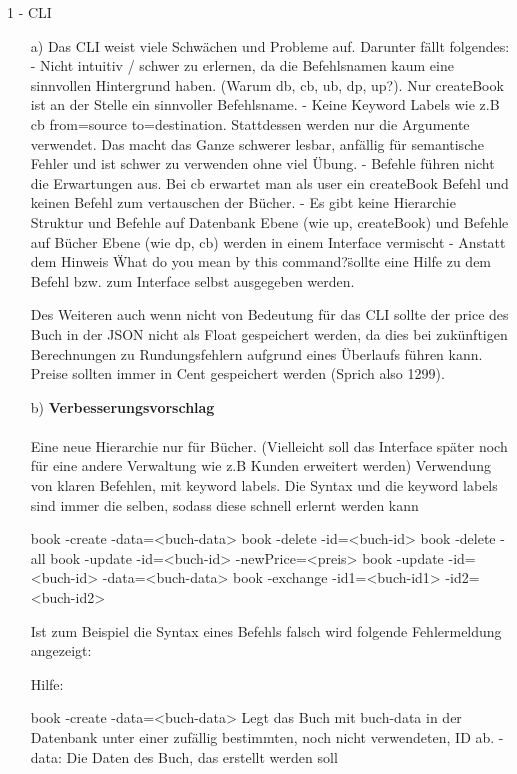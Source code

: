 \documentclass[a4paper]{article}
\begin{document}
\begin{exercise}{1 - CLI} 
\begin{itemize}
\item[a)]
Das CLI weist viele Schwächen und Probleme auf. Darunter fällt folgendes:
  - Nicht intuitiv / schwer zu erlernen, da die Befehlsnamen kaum eine sinnvollen
    Hintergrund haben. (Warum db, cb, ub, dp, up?). Nur createBook ist an der
    Stelle ein sinnvoller Befehlsname.
  - Keine Keyword Labels wie z.B cb from=source to=destination. Stattdessen werden
    nur die Argumente verwendet. Das macht das Ganze schwerer lesbar, anfällig
    für semantische Fehler und ist schwer zu verwenden ohne viel Übung.
  - Befehle führen nicht die Erwartungen aus. Bei cb erwartet man als user ein
    createBook Befehl und keinen Befehl zum vertauschen der Bücher.
  - Es gibt keine Hierarchie Struktur und Befehle auf Datenbank Ebene (wie up,
    createBook) und Befehle auf Bücher Ebene (wie dp, cb) werden in einem
    Interface vermischt
  - Anstatt dem Hinweis \"What do you mean by this command?\" sollte eine Hilfe
    zu dem Befehl bzw. zum Interface selbst ausgegeben werden.

Des Weiteren auch wenn nicht von Bedeutung für das CLI sollte der price des Buch
in der JSON nicht als Float gespeichert werden, da dies bei zukünftigen
Berechnungen zu Rundungsfehlern aufgrund eines Überlaufs führen kann. Preise
sollten immer in Cent gespeichert werden (Sprich also 1299).

\item[b)]\textbf{Verbesserungsvorschlag}\\\\
Eine neue Hierarchie nur für Bücher. (Vielleicht soll das Interface später noch
für eine andere Verwaltung wie z.B Kunden erweitert werden)
Verwendung von klaren Befehlen, mit keyword labels. Die Syntax und die keyword
labels sind immer die selben, sodass diese schnell erlernt werden kann

book -create -data=<buch-data>
book -delete -id=<buch-id>
book -delete -all
book -update -id=<buch-id> -newPrice=<preis>
book -update -id=<buch-id> -data=<buch-data>
book -exchange -id1=<buch-id1> -id2=<buch-id2>

Ist zum Beispiel die Syntax eines Befehls falsch wird folgende Fehlermeldung angezeigt:

Hilfe:

book -create -data=<buch-data>
  Legt das Buch mit buch-data in der Datenbank unter einer zufällig bestimmten, noch nicht verwendeten, ID ab.
  -data: Die Daten des Buch, das erstellt werden soll


\end{itemize}
\end{exercise}
\end{document}
